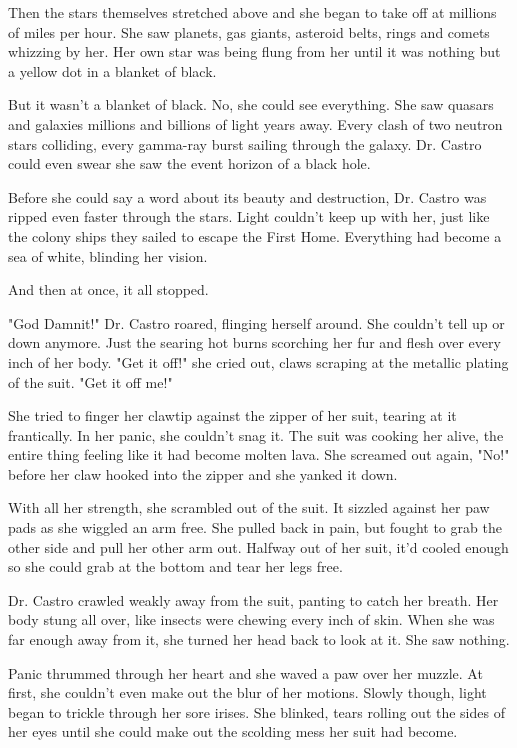 Then the stars themselves stretched above and she began to take off at millions of miles per hour. She saw planets, gas giants, asteroid belts, rings and comets whizzing by her. Her own star was being flung from her until it was nothing but a yellow dot in a blanket of black.

But it wasn't a blanket of black. No, she could see everything. She saw quasars and galaxies millions and billions of light years away. Every clash of two neutron stars colliding, every gamma-ray burst sailing through the galaxy. Dr. Castro could even swear she saw the event horizon of a black hole.

Before she could say a word about its beauty and destruction, Dr. Castro was ripped even faster through the stars. Light couldn't keep up with her, just like the colony ships they sailed to escape the First Home. Everything had become a sea of white, blinding her vision.

And then at once, it all stopped.

"God Damnit!" Dr. Castro roared, flinging herself around. She couldn't tell up or down anymore. Just the searing hot burns scorching her fur and flesh over every inch of her body. "Get it off!" she cried out, claws scraping at the metallic plating of the suit. "Get it off me!"

She tried to finger her clawtip against the zipper of her suit, tearing at it frantically. In her panic, she couldn't snag it. The suit was cooking her alive, the entire thing feeling like it had become molten lava. She screamed out again, "No!" before her claw hooked into the zipper and she yanked it down.

With all her strength, she scrambled out of the suit. It sizzled against her paw pads as she wiggled an arm free. She pulled back in pain, but fought to grab the other side and pull her other arm out. Halfway out of her suit, it'd cooled enough so she could grab at the bottom and tear her legs free.

Dr. Castro crawled weakly away from the suit, panting to catch her breath. Her body stung all over, like insects were chewing every inch of skin. When she was far enough away from it, she turned her head back to look at it. She saw nothing.

Panic thrummed through her heart and she waved a paw over her muzzle. At first, she couldn't even make out the blur of her motions. Slowly though, light began to trickle through her sore irises. She blinked, tears rolling out the sides of her eyes until she could make out the scolding mess her suit had become.

